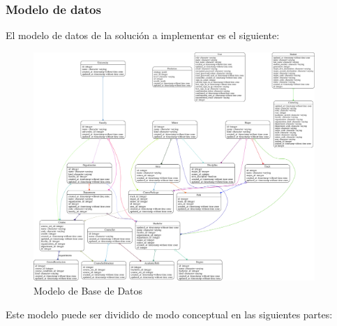 \subsubsection{Modelo de datos \label{sec:data_model}}

El modelo de datos de la solución a implementar es el siguiente:

	\begin{figure}[H]
		\begin{center}
			\includegraphics[width=0.95\textwidth]{./figures/chapter_03/04_modelo_de_datos.png}
			\caption{Modelo de Base de Datos}
			\label{fig:components_diagram_picture}
		\end{center}
	\end{figure}

Este modelo puede ser dividido de modo conceptual en las siguientes partes:

